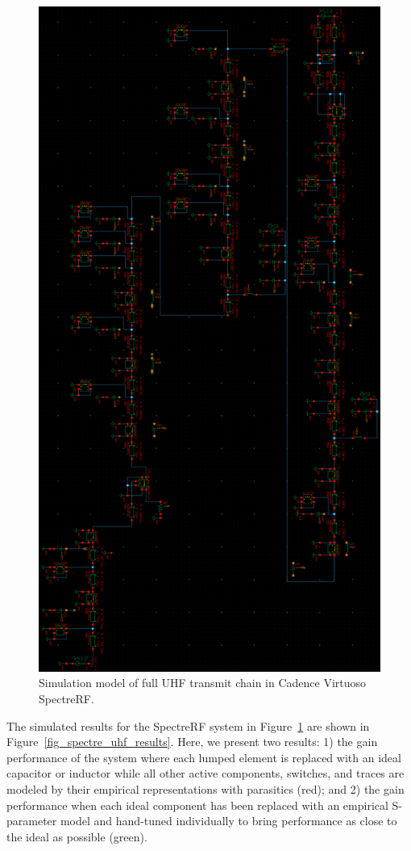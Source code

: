 \begin{figure}[p]
\centering
  \includegraphics[width=0.75\linewidth]{figs/matching/spectre_uhf_tx_complete_chain}   
    \caption{Simulation model of full UHF transmit chain in Cadence Virtuoso SpectreRF.}
\label{fig_spectre_uhf_circuit}
\end{figure}

	The simulated results for the SpectreRF system in Figure~\ref{fig_spectre_uhf_circuit} are shown in Figure~\ref{fig_spectre_uhf_results}.
	Here, we present two results: 1) the gain performance of the system where each lumped element is replaced with an ideal capacitor or inductor while all other active components, switches, and traces are modeled by their empirical representations with parasitics (red); and 2) the gain performance when each ideal component has been replaced with an empirical S-parameter model and hand-tuned individually to bring performance as close to the ideal as possible (green).
	
